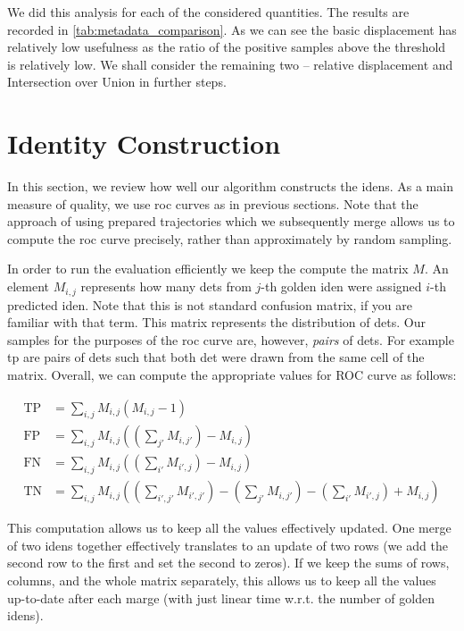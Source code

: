 We did this analysis for each of the considered quantities. The results are recorded in \autoref{tab:metadata_comparison}. As we can see the basic displacement has relatively low usefulness as the ratio of the positive samples above the threshold is relatively low. We shall consider the remaining two -- relative displacement and Intersection over Union in further steps.

\section{Identity Construction}

In this section, we review how well our algorithm constructs the \glspl{iden}. As a main measure of quality, we use \gls{roc} curves as in previous sections. Note that the approach of using prepared trajectories which we subsequently merge allows us to compute the \gls{roc} curve precisely, rather than approximately by random sampling.

In order to run the evaluation efficiently we keep the compute the matrix $M$. An element $M_{i,j}$ represents how many \glspl{det} from $j$-th golden \gls{iden} were assigned $i$-th predicted \gls{iden}. Note that this is not standard confusion matrix, if you are familiar with that term. This matrix represents the distribution of \glspl{det}. Our samples for the purposes of the \gls{roc} curve are, however, \emph{pairs} of \glspl{det}. For example \gls{tp} are pairs of \glspl{det} such that both \gls{det} were drawn from the same cell of the matrix. Overall, we can compute the appropriate values for ROC curve as follows:

\begin{align*}
    \mathrm{TP} &= \sum_{i,j} M_{i,j} (M_{i,j} - 1)\\
    \mathrm{FP} &= \sum_{i,j} M_{i,j} \left(\left(\sum_{j'}M_{i,j'}\right)-M_{i,j}\right)\\
    \mathrm{FN} &= \sum_{i,j} M_{i,j} \left(\left(\sum_{i'}M_{i',j}\right)-M_{i,j}\right)\\
    \mathrm{TN} &= \sum_{i,j} M_{i,j} \left(\left(\sum_{i',j'}M_{i',j'}\right) - \left(\sum_{j'}M_{i,j'}\right) - \left(\sum_{i'}M_{i',j}\right) + M_{i,j}\right)
\end{align*}

This computation allows us to keep all the values effectively updated. One merge of two \glspl{iden} together effectively translates to an update of two rows (we add the second row to the first and set the second to zeros). If we keep the sums of rows, columns, and the whole matrix separately, this allows us to keep all the values up-to-date after each marge (with just linear time w.r.t. the number of golden \glspl{iden}).

